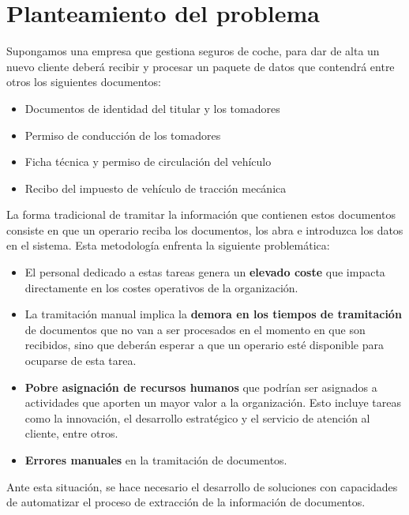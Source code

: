 \section{Planteamiento del problema}\label{sec:plantenamiento_problema}

Supongamos una empresa que gestiona seguros de coche, para dar de alta un nuevo cliente deberá recibir y procesar
un paquete de datos que contendrá entre otros los siguientes documentos:

\begin{itemize}
    \item Documentos de identidad del titular y los tomadores
    \item Permiso de conducción de los tomadores
    \item Ficha técnica y permiso de circulación del vehículo
    \item Recibo del impuesto de vehículo de tracción mecánica
\end{itemize}

La forma tradicional de tramitar la información que contienen estos documentos consiste en que un operario reciba los
documentos, los abra e introduzca los datos en el sistema.
Esta metodología enfrenta la siguiente problemática:

\begin{itemize}
    \item
    El personal dedicado a estas tareas genera un \textbf{elevado coste} que impacta directamente en los costes
    operativos de la organización.
    \item
    La tramitación manual implica la \textbf{demora en los tiempos de tramitación} de documentos que no van a ser
    procesados en el momento en que son recibidos, sino que deberán esperar a que un operario esté disponible para
    ocuparse de esta tarea.
    \item
    \textbf{Pobre asignación de recursos humanos} que podrían ser asignados a actividades que aporten un mayor valor a
    la organización.
    Esto incluye tareas como la innovación, el desarrollo estratégico y el servicio de atención al cliente, entre otros.
    \item
    \textbf{Errores manuales} en la tramitación de documentos.
\end{itemize}

Ante esta situación, se hace necesario el desarrollo de soluciones con capacidades de automatizar el proceso de
extracción de la información de documentos.

